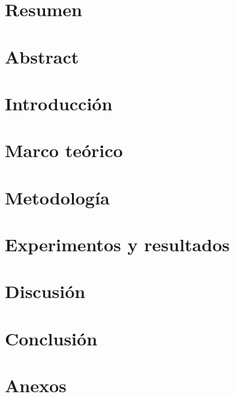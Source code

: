 \documentclass[12pt]{report}
\begin{document}




\chapter*{Resumen}


\chapter*{Abstract}


\tableofcontents

\listoffigures

\listoftables

\newpage
 

\chapter{Introducción}


\chapter{Marco teórico} \label{marco}


\chapter{Metodología} \label{metodologia}


\chapter{Experimentos y resultados} \label{resultados}


\chapter{Discusión}


\chapter{Conclusión}


\chapter{Anexos} \label{anexos}


\printbibliography[heading=bibintoc]
\end{document}
